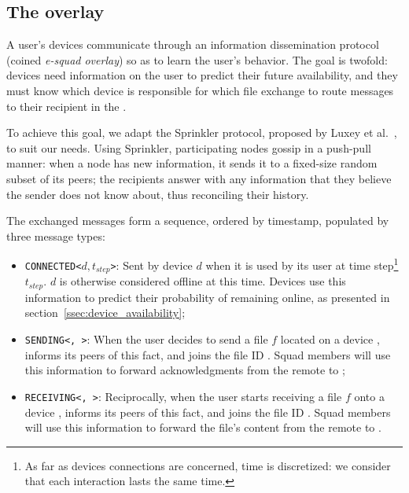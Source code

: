

\subsection{The \squad overlay}
\label{sec:squad_overlay}

A user's devices communicate through an information dissemination protocol (coined \emph{e-squad overlay}) so as to learn the user's behavior.
The goal is twofold: 
devices need information on the user to predict their future availability, 
and they must know which device is responsible for which file exchange to route messages to their recipient in the \squad.

To achieve this goal, we adapt the Sprinkler protocol, proposed by Luxey et al.~\cite{luxey:hal-01704172}, to suit our needs. 
Using Sprinkler, participating nodes gossip in a push-pull manner: 
when a node has new information, it sends it to a fixed-size random subset of its peers; 
the recipients answer with any information that they believe the sender does not know about, thus reconciling their history.

The exchanged messages form a sequence, ordered by timestamp, populated by three message types:
\begin{itemize}
	\item \texttt{CONNECTED<$d, t_{step}$>}: Sent by device $d$ when it is used by its user at time step\footnote{As far as devices connections are concerned, time is discretized: we consider that each interaction lasts the same time.} $t_{step}$. $d$ is otherwise considered offline at this time. Devices use this information to predict their probability of remaining online, as presented in section~\ref{ssec:device_availability};
	\item \texttt{SENDING<\sendingdevice, \fileid>}: When the user decides to send a file $f$ located on a device \sendingdevice, \sendingdevice informs its peers of this fact, and joins the file ID \fileid. Squad members will use this information to forward acknowledgments from the remote to \sendingdevice;
	\item \texttt{RECEIVING<\recdevice, \fileid>}: Reciprocally, when the user starts receiving a file $f$ onto a device \recdevice, \recdevice informs its peers of this fact, and joins the file ID \fileid. Squad members will use this information to forward the file's content from the remote to \recdevice.
\end{itemize}

